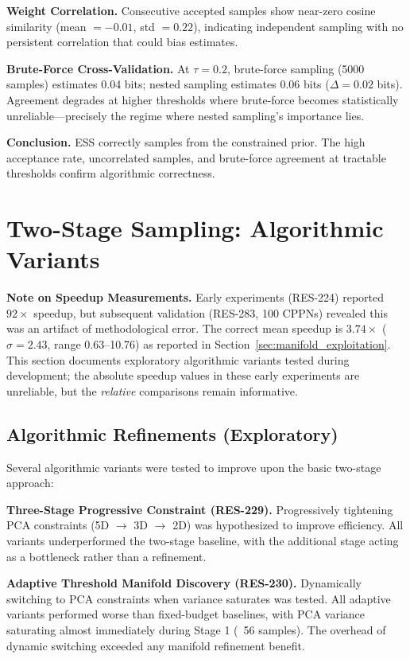 \textbf{Weight Correlation.} Consecutive accepted samples show near-zero cosine similarity (mean $= -0.01$, std $= 0.22$), indicating independent sampling with no persistent correlation that could bias estimates.

\textbf{Brute-Force Cross-Validation.} At $\tau = 0.2$, brute-force sampling (5000 samples) estimates 0.04 bits; nested sampling estimates 0.06 bits ($\Delta = 0.02$ bits). Agreement degrades at higher thresholds where brute-force becomes statistically unreliable---precisely the regime where nested sampling's importance lies.

\textbf{Conclusion.} ESS correctly samples from the constrained prior. The high acceptance rate, uncorrelated samples, and brute-force agreement at tractable thresholds confirm algorithmic correctness.




\section{Two-Stage Sampling: Algorithmic Variants}
\label{app:refinement_saturation}

\textbf{Note on Speedup Measurements.} Early experiments (RES-224) reported $92\times$ speedup, but subsequent validation (RES-283, 100 CPPNs) revealed this was an artifact of methodological error. The correct mean speedup is \textbf{$3.74\times$} ($\sigma=2.43$, range 0.63--10.76) as reported in Section~\ref{sec:manifold_exploitation}. This section documents exploratory algorithmic variants tested during development; the absolute speedup values in these early experiments are unreliable, but the \emph{relative} comparisons remain informative.

\subsection{Algorithmic Refinements (Exploratory)}

Several algorithmic variants were tested to improve upon the basic two-stage approach:

\textbf{Three-Stage Progressive Constraint (RES-229).} Progressively tightening PCA constraints (5D $\to$ 3D $\to$ 2D) was hypothesized to improve efficiency. All variants underperformed the two-stage baseline, with the additional stage acting as a bottleneck rather than a refinement.

\textbf{Adaptive Threshold Manifold Discovery (RES-230).} Dynamically switching to PCA constraints when variance saturates was tested. All adaptive variants performed worse than fixed-budget baselines, with PCA variance saturating almost immediately during Stage 1 (~56 samples). The overhead of dynamic switching exceeded any manifold refinement benefit.

